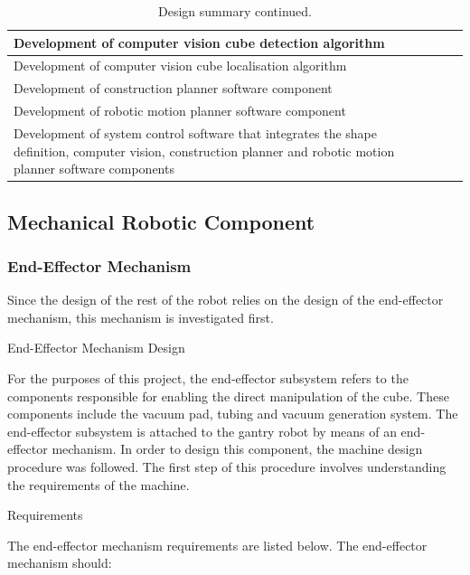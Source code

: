 \begin{table}[h]
	\renewcommand{\arraystretch}{1.3}
	\centering
	\begin{tabular}{|>{\raggedright}m{5cm}|>{\raggedright}m{4cm}|>{\raggedright\arraybackslash}m{4cm}|}
		\hline
		Development of computer vision cube detection algorithm & & \\
		\hline
		Development of computer vision cube localisation algorithm & & \\
		\hline
		Development of construction planner software component & & \\
		\hline
		Development of robotic motion planner software component & & \\
		\hline
		Development of system control software that integrates the shape definition, computer vision, construction planner and robotic motion planner software components & & \\
		\hline
	\end{tabular}
	\caption{\label{tab:design_summary_p2}Design summary continued.}
\end{table}

\subsection{Mechanical Robotic Component}

\subsubsection{End-Effector Mechanism}

Since the design of the rest of the robot relies on the design of the end-effector mechanism, this mechanism is investigated first.

End-Effector Mechanism Design

For the purposes of this project, the end-effector subsystem refers to the components responsible for enabling the direct manipulation of the cube. These components include the vacuum pad, tubing and vacuum generation system. The end-effector subsystem is attached to the gantry robot by means of an end-effector mechanism. In order to design this component, the machine design procedure was followed. The first step of this procedure involves understanding the requirements of the machine.

Requirements

The end-effector mechanism requirements are listed below. The end-effector mechanism should:

